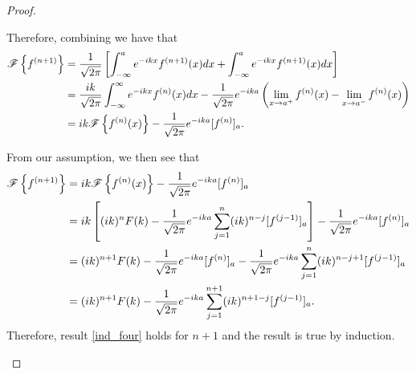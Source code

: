 \begin{proof}
\begin{enumerate}
      Therefore, combining we have that
      \begin{align*}
        \mathscr{F}\left\{ {f^{(n+1)}} \right\}
        &= \frac{1}{\sqrt{2\pi}}\left[\int_{-\infty}^{a}e^{-ikx}f^{(n+1)}(x)dx + \int_{-\infty}^{a}e^{-ikx}f^{(n+1)}(x)dx\right] \\
        &= \frac{ik}{\sqrt{2\pi}}\int_{-\infty}^{\infty}e^{-ikx}f^{(n)}(x)dx - \frac{1}{\sqrt{2\pi}}e^{-ika}\left(\lim_{x\to a^{+}}f^{(n)}(x) - \lim_{x\to a^{-}}f^{(n)}(x)\right) \\
        &= ik \mathscr{F}\left\{ {f^{(n)}(x)} \right\} - \frac{1}{\sqrt{2\pi}}e^{-ika}[f^{(n)}]_a.
      \end{align*}

      From our assumption, we then see that
      \begin{align*}
        \mathscr{F}\left\{ {f^{(n+1)}} \right\} &= ik \mathscr{F}\left\{ {f^{(n)}(x)} \right\} - \frac{1}{\sqrt{2\pi}}e^{-ika}[f^{(n)}]_a \\
        &= ik \left[(ik)^n F(k) - \frac{1}{\sqrt{2\pi}}e^{-ika}\sum_{j=1}^{n} (ik)^{n-j} [f^{(j-1)}]_a\right] - \frac{1}{\sqrt{2\pi}}e^{-ika}[f^{(n)}]_a \\
        &= (ik)^{n+1}F(k) - \frac{1}{\sqrt{2\pi}}e^{-ika}[f^{(n)}]_a - \frac{1}{\sqrt{2\pi}}e^{-ika}\sum_{j=1}^{n} (ik)^{n-j+1} [f^{(j-1)}]_a  \\
        &= (ik)^{n+1}F(k) - \frac{1}{\sqrt{2\pi}}e^{-ika}\sum_{j=1}^{n+1} (ik)^{n+1-j} [f^{(j-1)}]_a .
      \end{align*}
      Therefore, result \eqref{ind_four} holds for $n+1$ and the result is true by induction.
  \end{enumerate}
\end{proof}
\newpage
